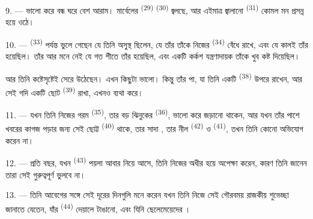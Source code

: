 9. --- ভালো করে বন্ধ ঘরে বেশ আরাম। মার্বেলের 
\textsuperscript{(29)}  \textsuperscript{(30)} জ্বলছে, আর
এইমাত্র জ্বালানো  \textsuperscript{(31)} কোমল  মন
প্রসন্ন হয়ে ওঠে।

\VUsaut{4.2mm}
\VUsaut{3.0mm}

10. ---  \textsuperscript{(33)} পর্যন্ত ভুলে গেছেন যে তিনি অসুস্থ
ছিলেন, যে তাঁর  তাঁকে নিজের 
\textsuperscript{(34)} বেঁধে রাখে, এবং যে কালই তাঁর 
হয়েছিল। তাঁর আর মনে নেই যে গত শীতে তাঁর  হয়েছিল, এবং
একটি কর্কশ যন্ত্রণাদায়ক  তাঁকে খুব কষ্ট দিয়েছিল।

আর তিনি কষ্টেসৃষ্টেই সেরে উঠেছেন। এখন কিছুটা ভালো। কিন্তু তাঁর পা, যা তিনি
একটি  \textsuperscript{(38)} উপরে রাখেন, আর সেই গদি একটি ছোট
 \textsuperscript{(39)} রাখা, এখনও ব্যথা করে।

11. --- যখন তিনি নিজের গরম  \textsuperscript{(35)}, তার
বড় ঝিনুকের  \textsuperscript{(36)}, ভালো করে জড়ানো থাকেন, আর
যখন তাঁর পাশে খবরের কাগজ পড়ার জন্য সেই ছোট্ট 
\textsuperscript{(40)} থাকে, তার সাদা , তার নীল 
\textsuperscript{(42)} ও  \textsuperscript{(41)}, তখন তিনি কোনো
অভিযোগ করেন না।

12. --- প্রতি বছর, যখন  \textsuperscript{(43)} পয়লা
  আবার নিয়ে আসে, তিনি নিজের
 অধীর হয়ে অপেক্ষা করেন, কারণ তিনি জানেন তারা সেই
গুরুত্বপূর্ণ  ভুলবে না।

13. --- তিনি আবেগের সঙ্গে সেই দূরের দিনগুলি মনে করেন যখন তিনি নিজে সেই
গৌরবময় রাজকীয়  শুভেচ্ছা জানাতে যেতেন, যাঁর
 \textsuperscript{(44)} দেয়ালে টাঙানো, এবং যিনি
ছেলেমেয়েদের ।
\VUsaut{6.0mm}
\VUfilet{22mm}

